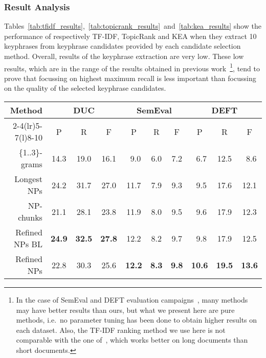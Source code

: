     \subsubsection{Result Analysis}
    \label{subsubsec:candidate_extraction_result_analysis}
      Tables~\ref{tab:tfidf_results},~\ref{tab:topicrank_results}~and~\ref{tab:kea_results}
      show the performance of respectively TF-IDF, TopicRank and KEA when they
      extract 10 keyphrases from keyphrase candidates provided by each candidate
      selection method. Overall, results of the keyphrase extraction are very
      low. These low results, which are in the range of the results obtained in
      previous
      work~\cite{hassan2010conundrums,kim2010semeval,paroubek2012deft}\footnote{In
      the case of SemEval and DEFT evaluation
      campaigns~\cite{kim2010semeval,paroubek2012deft}, many methods may have
      better results than ours, but what we present here are pure methods,
      i.e.~no parameter tuning has been done to obtain higher results on each
      dataset. Also, the TF-IDF ranking method we use here is not comparable
      with the one of~, which works better on long
      documents than short documents.}, tend to prove that focussing on highest
      maximum recall is less important than focussing on the quality of the
      selected keyphrase candidates.
      \begin{table*}
        \centering
        \begin{tabular}{@{}rccccccccc@{}}
          \toprule
          \multirow{2}{*}[-2pt]{\textbf{Method}} & \multicolumn{3}{c}{\textbf{DUC}} & \multicolumn{3}{c}{\textbf{SemEval}} & \multicolumn{3}{c}{\textbf{DEFT}}\\
          \cmidrule(r){2-4}\cmidrule(lr){5-7}\cmidrule(l){8-10}
          & P & R & F & P & R & F & P & R & F\\
          \midrule
          \{1..3\}-grams & 14.3 & 19.0 & 16.1 & $~~$9.0 & $~~$6.0 & $~~$7.2 & $~~$6.7 & 12.5 & $~~$8.6\\
          Longest NPs & 24.2 & 31.7 & 27.0 & 11.7 & $~~$7.9 & $~~$9.3 & $~~$9.5 & 17.6 & 12.1\\
          NP-chunks & 21.1 & 28.1 & 23.8 & 11.9 & $~~$8.0 & $~~$9.5 & $~~$9.6 & 17.9 & 12.3\\
          Refined NPs BL & \textbf{24.9} & \textbf{32.5} & \textbf{27.8} & 12.2 & $~~$8.2 & $~~$9.7 & $~~$9.8 & 17.9 & 12.5\\
          Refined NPs & 22.8 & 30.3 & 25.6 & \textbf{12.2} & \textbf{$~~$8.3} & \textbf{$~~$9.8} & \textbf{10.6} & \textbf{19.5} & \textbf{13.6}\\
          \bottomrule
        \end{tabular}
        \caption{Comparison of candidate selection methods, when 10 keyphrases
                 are extracted by \textbf{TF-IDF}.
                 \label{tab:tfidf_results}}
      \end{table*}
